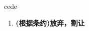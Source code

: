 
\begin{frame}
{\huge cede}
\begin{center}
\begin{enumerate}\Large
  \item \textbf{(根据条约)放弃，割让}
\end{enumerate}
\end{center}
\end{frame}
